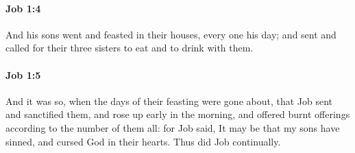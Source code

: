 		\paragraph{Job 1:4} %
			\label{JOB-1-4}

			And his sons went and feasted in their houses, every one his day; and sent and called for their three sisters to eat and to drink with them.


		\paragraph{Job 1:5} %
			\label{JOB-1-5}

			And it was so, when the days of their feasting were gone about, that Job sent and sanctified them, and rose up early in the morning, and offered burnt offerings according to the number of them all: for Job said, It may be that my sons have sinned, and cursed God in their hearts. Thus did Job continually.

